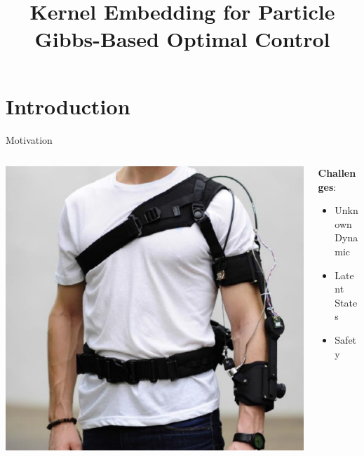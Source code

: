 \documentclass[student, noshadow, itr, english, aspectratio=169]{ITR_LSR_slides}
\title{Kernel Embedding for Particle Gibbs-Based Optimal Control}
\begin{document}
\begin{frame}
    \titlepage
\end{frame}


\section{Introduction}
\begin{frame}{Motivation}	
\begin{columns}[onlytextwidth, T]
		\begin{column}{.5\textwidth}
			\includegraphics[width= .8\textwidth]{Motivation_pic}
			\cite[4]{Xiloyannis_19}
		\end{column}
		\begin{column}{.5\textwidth}
		\vspace{1cm}
		\textbf{Challenges}:
		\vspace{.2cm}
			\begin{itemize}
			\item Unknown Dynamic
			\item Latent States
			\item Safety
			\end{itemize}
		\end{column}
	\end{columns}\vspace{.5cm}
\end{frame}
\end{document}

